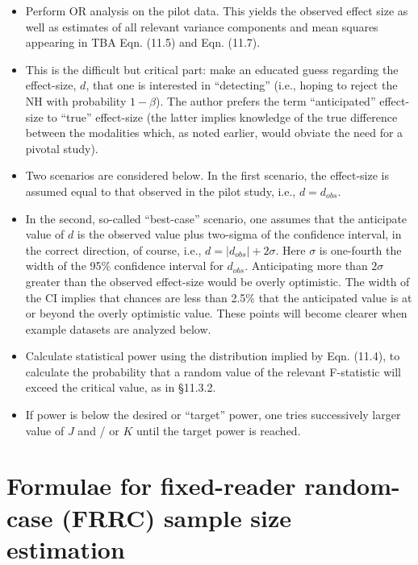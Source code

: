 \documentclass[
]{book}
\providecommand{\tightlist}{%
  \setlength{\itemsep}{0pt}\setlength{\parskip}{0pt}}
\begin{document}
\begin{itemize}
\tightlist
\item
  Perform OR analysis on the pilot data. This yields the observed effect size as well as estimates of all relevant variance components and mean squares appearing in TBA Eqn. (11.5) and Eqn. (11.7).
\item
  This is the difficult but critical part: make an educated guess regarding the effect-size, \(d\), that one is interested in ``detecting'' (i.e., hoping to reject the NH with probability \(1-\beta\)). The author prefers the term ``anticipated'' effect-size to ``true'' effect-size (the latter implies knowledge of the true difference between the modalities which, as noted earlier, would obviate the need for a pivotal study).
\item
  Two scenarios are considered below. In the first scenario, the effect-size is assumed equal to that observed in the pilot study, i.e., \(d = d_{obs}\).
\item
  In the second, so-called ``best-case'' scenario, one assumes that the anticipate value of \(d\) is the observed value plus two-sigma of the confidence interval, in the correct direction, of course, i.e., \(d=\left | d_{obs} \right |+2\sigma\). Here \(\sigma\) is one-fourth the width of the 95\% confidence interval for \(d_{obs}\). Anticipating more than \(2\sigma\) greater than the observed effect-size would be overly optimistic. The width of the CI implies that chances are less than 2.5\% that the anticipated value is at or beyond the overly optimistic value. These points will become clearer when example datasets are analyzed below.
\item
  Calculate statistical power using the distribution implied by Eqn. (11.4), to calculate the probability that a random value of the relevant F-statistic will exceed the critical value, as in §11.3.2.
\item
  If power is below the desired or ``target'' power, one tries successively larger value of \(J\) and / or \(K\) until the target power is reached.
\end{itemize}

\hypertarget{RocSampleSizeOR-FRRC-sample-size-estimation}{%
\section{Formulae for fixed-reader random-case (FRRC) sample size estimation}\label{RocSampleSizeOR-FRRC-sample-size-estimation}}
\end{document}
